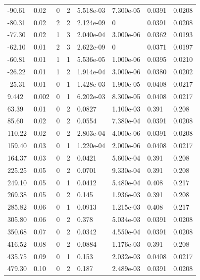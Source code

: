 \documentclass[preview]{standalone}
\begin{document}
{{\begin{tabular}{L{1.2cm}C{1.2cm} C{0.3cm}C{0.5cm} C{1.4cm}C{1.4cm} C{1.4cm}C{1.4cm}}
  -90.61  &  0.02  & 0     &  2 &  5.518e-03  & 7.300e-05  & 0.0391 &  0.0208   \\ 
  -80.31  &  0.02  & 2     &  2 &  2.124e-09  & 0  & 0.0391 &  0.0208   \\ 
  -77.30  &  0.02  & 1     &  3 &  2.040e-04  & 3.000e-06  & 0.0362 &  0.0193   \\ 
  -62.10  &  0.01  & 2     &  3 &  2.622e-09  & 0  & 0.0371 &  0.0197   \\ 
  -60.81  &  0.01  & 1     &  1 &  5.536e-05  & 1.000e-06  & 0.0395 &  0.0210   \\ 
  -26.22  &  0.01  & 1     &  2 &  1.914e-04  & 3.000e-06  & 0.0380 &  0.0202   \\ 
  -25.31  &  0.01  & 0     &  1 &  1.428e-03  & 1.900e-05  & 0.0408 &  0.0217   \\ 
  9.442  &  0.002  & 0     &  1 &  6.202e-03  & 8.300e-05  & 0.0408 &  0.0217   \\ 
  63.39  &  0.01  & 0     &  2 &  0.0827  & 1.100e-03  & 0.391 &  0.208   \\ 
  85.60  &  0.02  & 0     &  2 &  0.0554  & 7.380e-04  & 0.0391 &  0.0208   \\ 
  110.22  &  0.02  & 0     &  2 &  2.803e-04  & 4.000e-06  & 0.0391 &  0.0208   \\ 
  159.40  &  0.03  & 0     &  1 &  1.220e-04  & 2.000e-06  & 0.0408 &  0.0217   \\ 
  164.37  &  0.03  & 0     &  2 &  0.0421  & 5.600e-04  & 0.391 &  0.208   \\ 
  225.25  &  0.05  & 0     &  2 &  0.0701  & 9.330e-04  & 0.391 &  0.208   \\ 
  249.10  &  0.05  & 0     &  1 &  0.0412  & 5.480e-04  & 0.408 &  0.217   \\ 
  269.38  &  0.05  & 0     &  2 &  0.145  & 1.936e-03  & 0.391 &  0.208   \\ 
  285.82  &  0.06  & 0     &  1 &  0.0913  & 1.215e-03  & 0.408 &  0.217   \\ 
  305.80  &  0.06  & 0     &  2 &  0.378  & 5.034e-03  & 0.0391 &  0.0208   \\ 
  350.68  &  0.07  & 0     &  2 &  0.0342  & 4.550e-04  & 0.0391 &  0.0208   \\ 
  416.52  &  0.08  & 0     &  2 &  0.0884  & 1.176e-03  & 0.391 &  0.208   \\ 
  435.75  &  0.09  & 0     &  1 &  0.153  & 2.032e-03  & 0.0408 &  0.0217   \\ 
  479.30  &  0.10  & 0     &  2 &  0.187  & 2.489e-03  & 0.0391 &  0.0208   \\ 

\end{tabular}}}
\end{document}
